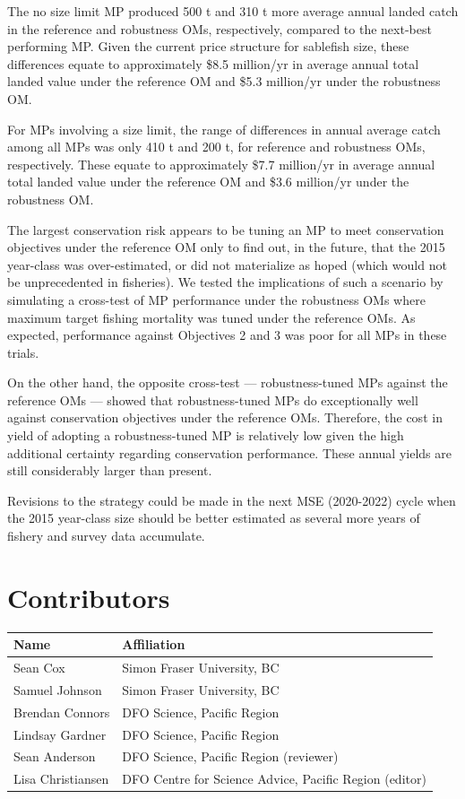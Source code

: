 \documentclass[11pt]{book}
\begin{document}
The no size limit MP produced 500 t and 310 t more average annual landed catch in the reference and robustness OMs, respectively, compared to the next-best performing MP. Given the current price structure for sablefish size, these differences equate to approximately \$8.5 million/yr in average annual total landed value under the reference OM and \$5.3 million/yr under the robustness OM.

For MPs involving a size limit, the range of differences in annual average catch among all MPs was only 410 t and 200 t, for reference and robustness OMs, respectively. These equate to approximately \$7.7 million/yr in average annual total landed value under the reference OM and \$3.6 million/yr under the robustness OM.

The largest conservation risk appears to be tuning an MP to meet conservation objectives under the reference OM only to find out, in the future, that the 2015 year-class was over-estimated, or did not materialize as hoped (which would not be unprecedented in fisheries). We tested the implications of such a scenario by simulating a cross-test of MP performance under the robustness OMs where maximum target fishing mortality was tuned under the reference OMs. As expected, performance against Objectives 2 and 3 was poor for all MPs in these trials.

On the other hand, the opposite cross-test --- robustness-tuned MPs against the reference OMs --- showed that robustness-tuned MPs do exceptionally well against conservation objectives under the reference OMs. Therefore, the cost in yield of adopting a robustness-tuned MP is relatively low given the high additional certainty regarding conservation performance. These annual yields are still considerably larger than present.

Revisions to the strategy could be made in the next MSE (2020-2022) cycle when the 2015 year-class size should be better estimated as several more years of fishery and survey data accumulate.

\hypertarget{contributors}{%
\section{Contributors}\label{contributors}}
\begin{longtable}[]{@{}ll@{}}
\toprule
Name & Affiliation\tabularnewline
\midrule
\endhead
Sean Cox & Simon Fraser University, BC\tabularnewline
Samuel Johnson & Simon Fraser University, BC\tabularnewline
Brendan Connors & DFO Science, Pacific Region\tabularnewline
Lindsay Gardner & DFO Science, Pacific Region\tabularnewline
Sean Anderson & DFO Science, Pacific Region (reviewer)\tabularnewline
Lisa Christiansen & DFO Centre for Science Advice, Pacific Region (editor)\tabularnewline
\bottomrule
\end{longtable}
\MakeApproval
\end{document}

